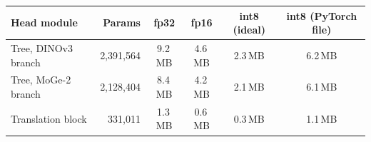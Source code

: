 \begin{tabular}{@{}l r cccc@{}}
\toprule
Head module & Params & fp32 & fp16 & int8 (ideal) & int8 (PyTorch file) \\
\midrule
Tree, DINOv3 branch & 2,391,564 & 9.2\,MB & 4.6\,MB & 2.3\,MB & 6.2\,MB \\
Tree, MoGe-2 branch & 2,128,404 & 8.4\,MB & 4.2\,MB & 2.1\,MB & 6.1\,MB \\
Translation block & 331,011 & 1.3\,MB & 0.6\,MB & 0.3\,MB & 1.1\,MB \\
\bottomrule
\end{tabular}